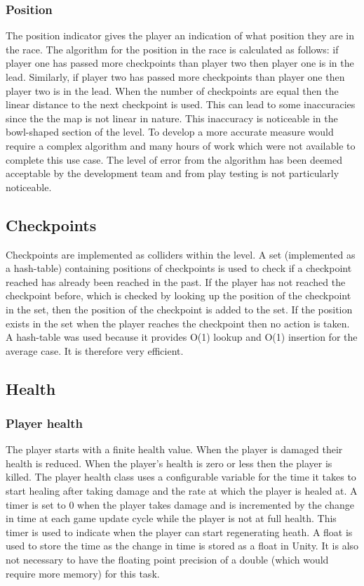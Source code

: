 \documentclass[11pt,a4paper]{article}
\begin{document}
\subsubsection{Position}
The position indicator gives the player an indication of what position they are in the race. The algorithm for the position in the race is calculated as follows: if player one has passed more checkpoints than player two then player one is in the lead. Similarly, if player two has passed more checkpoints than player one then player two is in the lead. When the number of checkpoints are equal then the linear distance to the next checkpoint is used. This can lead to some inaccuracies since the the map is not linear in nature. This inaccuracy is noticeable in the bowl-shaped section of the level. To develop a more accurate measure would require a complex algorithm and many hours of work which were not available to complete this use case. The level of error from the algorithm has been deemed acceptable by the development team and from play testing is not particularly noticeable.
\subsection{Checkpoints}
Checkpoints are implemented as colliders within the level. A set (implemented as a hash-table) containing positions of checkpoints is used to check if a checkpoint reached has already been reached in the past. If the player has not reached the checkpoint before, which is checked by looking up the position of the checkpoint in the set, then the position of the checkpoint is added to the set. If the position exists in the set when the player reaches the checkpoint then no action is taken. A hash-table was used because it provides O(1) lookup and O(1) insertion for the average case. It is therefore very efficient. 
\subsection{Health}
\subsubsection{Player health}
The player starts with a finite health value. When the player is damaged their health is reduced. When the player's health is zero or less then the player is killed. The player health class uses a configurable variable for the time it takes to start healing after taking damage and the rate at which the player is healed at. A timer is set to 0 when the player takes damage and is incremented by the change in time at each game update cycle while the player is not at full health. This timer is used to indicate when the player can start regenerating heath. A float is used to store the time as the change in time is stored as a float in Unity. It is also not necessary to have the floating point precision of a double (which would require more memory) for this task.
\end{document}

